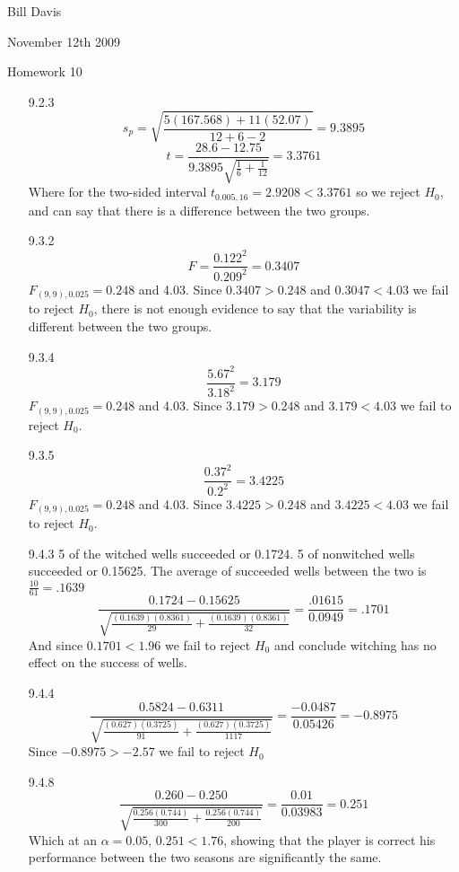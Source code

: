 \documentclass[11pt,fleqn]{article}
\begin{document}
\newcommand{\mbf}[1]{\mbox{{\bfseries #1}}}
\newcommand{\N}{\mbf{N}}
\renewcommand{\O}{\mbf{O}}
\newcommand{\tabfrac}[2]{%
	\setlength{\fboxrule}{0pt}%
	\fbox{$\frac{#1}{#2}$}%
}

\noindent Bill Davis 

\noindent November 12th 2009 

\noindent Homework 10

\begin{enumerate}
  \item[9.2.3] 
  \[
  s_p = \sqrt{\frac{5(167.568)+11(52.07)}{12+6-2}} = 9.3895
  \]
    \[
  t = \frac{28.6-12.75}{9.3895\sqrt{\frac{1}{6}+\frac{1}{12}}} = 3.3761
  \]
  Where for the two-sided interval $t_{0.005, 16} = 2.9208 < 3.3761$ so we
  reject $H_0$, and can say that there is a difference between the two groups. 
  \item[9.3.2]
  \[
   F = \frac{0.122^2}{0.209^2} = 0.3407
  \]
  $F_{(9,9),0.025} = 0.248 $ and 4.03. Since $0.3407> 0.248$ and $0.3047<4.03$
  we fail to reject $H_0$, there is not enough evidence to say that the
  variability is different between the two groups. 
  \item[9.3.4]
  \[
  \frac{5.67^2}{3.18^2} = 3.179
  \]
   $F_{(9,9),0.025} = 0.248 $ and 4.03. Since $3.179> 0.248$ and $3.179<4.03$
  we fail to reject $H_0$.
  \item[9.3.5]
  \[
  \frac{0.37^2}{0.2^2} = 3.4225
  \]
   $F_{(9,9),0.025} = 0.248 $ and 4.03. Since $3.4225> 0.248$ and $3.4225<4.03$
  we fail to reject $H_0$. 
  \item[9.4.3]
  5 of the witched wells succeeded or 0.1724. 5 of nonwitched wells succeeded
  or 0.15625. The average of succeeded wells between the two is $\frac{10}{61} =
  .1639$
  \[
  \frac{0.1724-0.15625}{ \sqrt{\frac{(0.1639)(0.8361)}{29} +
  \frac{(0.1639)(0.8361)}{32}} } = \frac{.01615}{0.0949} = .1701 
  \]
  And since $0.1701 < 1.96$ we fail to reject $H_0$ and conclude witching has no
  effect on the success of wells. 
  \item[9.4.4]
  \[
  \frac{0.5824 - 0.6311}{\sqrt{\frac{(0.627)(0.3725)}{91} +
  \frac{(0.627)(0.3725)}{1117}}} = \frac{-0.0487}{0.05426} = -0.8975
  \]
  Since $-0.8975 > -2.57$ we fail to reject $H_0$
  \item[9.4.8]
  \[
  \frac{0.260 - 0.250}{\sqrt{\frac{0.256(0.744)}{300} +
  \frac{0.256(0.744)}{200}}} = \frac{0.01}{0.03983} = 0.251
  \]
  Which at an $\alpha=0.05$, $0.251<1.76$, showing that the player is correct
  his performance between the two seasons are significantly the same. 

\end{enumerate}
\end{document}
